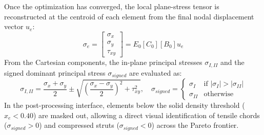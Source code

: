 \documentclass{article}
\begin{document}
\noindent Once the optimization has converged, the local plane-stress tensor is reconstructed at the centroid of each element from the final nodal displacement vector $u_e$:
\begin{equation}
\sigma_e = \begin{bmatrix} \sigma_x \\ \sigma_y \\ \tau_{xy} \end{bmatrix} = E_0 [C_0] [B_0] u_e
\end{equation}
From the Cartesian components, the in-plane principal stresses $\sigma_{I, II}$ and the signed dominant principal stress $\sigma_{signed}$ are evaluated as:
\begin{equation}
\sigma_{I, II} = \frac{\sigma_x + \sigma_y}{2} \pm \sqrt{\left(\frac{\sigma_x - \sigma_y}{2}\right)^2 + \tau_{xy}^2}, \quad \sigma_{signed} = \begin{cases} \sigma_I & \text{if } |\sigma_I| > |\sigma_{II}| \\ \sigma_{II} & \text{otherwise} \end{cases}
\end{equation}
In the post-processing interface, elements below the solid density threshold ($\hat{x}_e < 0.40$) are masked out, allowing a direct visual identification of tensile chords ($\sigma_{signed} > 0$) and compressed struts ($\sigma_{signed} < 0$) across the Pareto frontier.
\end{document}
